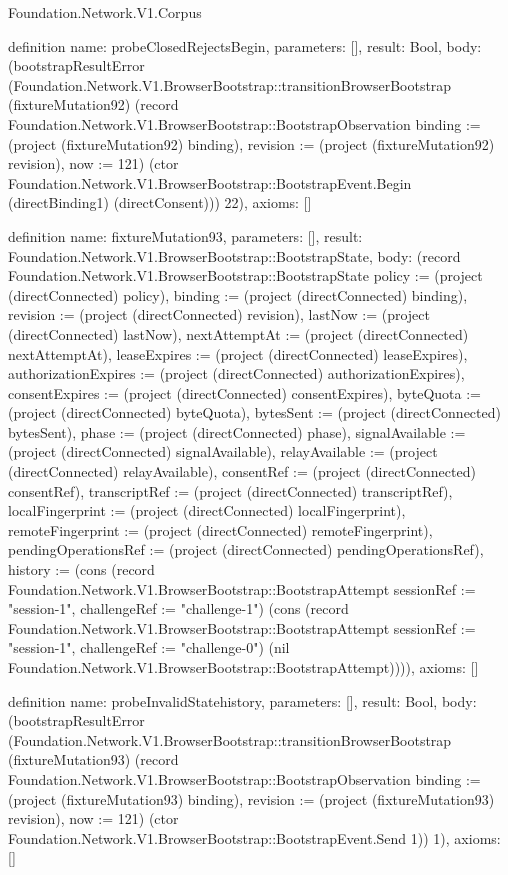 \begin{lexlean}{Foundation.Network.V1.Corpus}
\begin{semanticmodule}
definition{
  name: probeClosedRejectsBegin,
  parameters: [],
  result: Bool,
  body: (bootstrapResultError (Foundation.Network.V1.BrowserBootstrap::transitionBrowserBootstrap (fixtureMutation92) (record Foundation.Network.V1.BrowserBootstrap::BootstrapObservation {binding := (project (fixtureMutation92) binding), revision := (project (fixtureMutation92) revision), now := 121}) (ctor Foundation.Network.V1.BrowserBootstrap::BootstrapEvent.Begin (directBinding1) (directConsent))) 22),
  axioms: []
}

definition{
  name: fixtureMutation93,
  parameters: [],
  result: Foundation.Network.V1.BrowserBootstrap::BootstrapState,
  body: (record Foundation.Network.V1.BrowserBootstrap::BootstrapState {policy := (project (directConnected) policy), binding := (project (directConnected) binding), revision := (project (directConnected) revision), lastNow := (project (directConnected) lastNow), nextAttemptAt := (project (directConnected) nextAttemptAt), leaseExpires := (project (directConnected) leaseExpires), authorizationExpires := (project (directConnected) authorizationExpires), consentExpires := (project (directConnected) consentExpires), byteQuota := (project (directConnected) byteQuota), bytesSent := (project (directConnected) bytesSent), phase := (project (directConnected) phase), signalAvailable := (project (directConnected) signalAvailable), relayAvailable := (project (directConnected) relayAvailable), consentRef := (project (directConnected) consentRef), transcriptRef := (project (directConnected) transcriptRef), localFingerprint := (project (directConnected) localFingerprint), remoteFingerprint := (project (directConnected) remoteFingerprint), pendingOperationsRef := (project (directConnected) pendingOperationsRef), history := (cons (record Foundation.Network.V1.BrowserBootstrap::BootstrapAttempt {sessionRef := "session-1", challengeRef := "challenge-1"}) (cons (record Foundation.Network.V1.BrowserBootstrap::BootstrapAttempt {sessionRef := "session-1", challengeRef := "challenge-0"}) (nil Foundation.Network.V1.BrowserBootstrap::BootstrapAttempt)))}),
  axioms: []
}

definition{
  name: probeInvalidStatehistory,
  parameters: [],
  result: Bool,
  body: (bootstrapResultError (Foundation.Network.V1.BrowserBootstrap::transitionBrowserBootstrap (fixtureMutation93) (record Foundation.Network.V1.BrowserBootstrap::BootstrapObservation {binding := (project (fixtureMutation93) binding), revision := (project (fixtureMutation93) revision), now := 121}) (ctor Foundation.Network.V1.BrowserBootstrap::BootstrapEvent.Send 1)) 1),
  axioms: []
}


\end{semanticmodule}
\end{lexlean}
